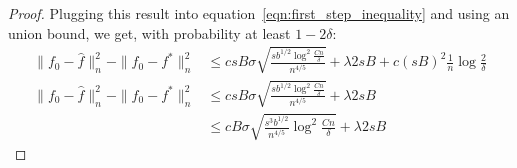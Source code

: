 \begin{proof}






Plugging this result into equation~\ref{eqn:first_step_inequality} and using an union bound, we get, with probability at least $1 - 2\delta$:
\begin{align}
\|f_0 - \hat{f} \|_n^2 - \| f_0 - f^* \|_n^2 
   &\leq c sB \sigma \sqrt{ 
   \frac{s b^{1/2} \log^2 \frac{Cn}{\delta}}{n^{4/5}}}
   + \lambda 2 s B + c (sB)^2 \frac{1}{n} \log \frac{2}{\delta} \nonumber\\
\|f_0 - \hat{f} \|_n^2 - \| f_0 - f^* \|_n^2 
   &\leq c sB \sigma \sqrt{ 
   \frac{s b^{1/2} \log^2 \frac{Cn}{\delta}}{n^{4/5}}}
   + \lambda 2 s B \nonumber\\   
   &\leq c B \sigma 
    \sqrt{ \frac{s^3 b^{1/2}}{n^{4/5}} \log^2 \frac{Cn}{\delta}} + \lambda 2 sB
\label{eqn:second_step_inequality}
\end{align}


\end{proof}
